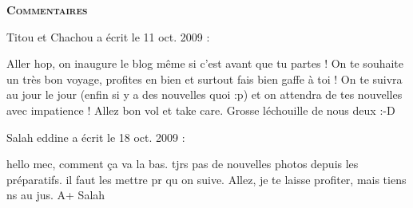\bigskip
\textbf{\textsc{Commentaires}}

\medskip
Titou et Chachou a écrit le 11 oct. 2009 :
\begin{displayquote}
Aller hop, on inaugure le blog même si c'est avant que tu partes !
On te souhaite un très bon voyage, profites en bien et surtout fais bien gaffe à toi !
On te suivra au jour le jour (enfin si y a des nouvelles quoi :p) et on attendra de tes nouvelles avec impatience !
Allez bon vol et take care.
Grosse léchouille de nous deux :-D
\end{displayquote}

\medskip
Salah eddine a écrit le 18 oct. 2009 :
\begin{displayquote}
hello mec,
comment ça va la bas. tjrs pas de nouvelles photos depuis les préparatifs. il faut les mettre pr qu on suive.
Allez, je te laisse profiter, mais tiens ns au jus.
A+
Salah
\end{displayquote}

